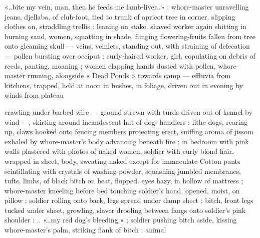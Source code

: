 «..bite my vein, man, then he feeds me lamb-liver..» ; whore-master
unravelling jeans, djellaba, of club-foot, tied to trunk of apricot tree
in corner, slipping clothes on, straddling trellis : leaning on stake.
shaved worker again shitting in burning sand, women, squatting in
shade, flinging flowering-fruits fallen from tree onto gleaming skull
— veins, veinlets, standing out, with straining of defecation —
pollen bursting over occiput ; curly-haired worker, girl, copulating on
debris of reeds, panting, moaning ; women clapping hands dusted
with pollen, whore-master running, alongside « Dead Ponds »
towards camp — effluvia from kitchens, trapped, held at noon in
bushes, in foliage, driven out in evening by winds from plateau

crawling under barbed wire — ground strewn with turds driven out
of kennel by wind —, skirting around incandescent hut of dog-
handlers : lithe dogs, rearing up, claws hooked onto fencing
members projecting erect, sniffing aroma of jissom exhaled by
whore-master's body advancing beneath fire ; in bedroom with pink
walls plastered with photos of naked women, soldier with curly blond
hair, wrapped in sheet, body, sweating naked except for immaculate
Cotton pants scintillating with crystals of washing-powder, squashing
jumbled membranes, tufts, limbs, of black bitch on heat, flopped.
eyes hazy, in hollow of mattress ; whore-master kneeling before bed
touching soldier's hand, opened, moist, on pillow ; soldier rolling
onto back, legs spread under damp sheet ; bitch, front legs tucked
under sheet, growling, slaver drooling between fangs onto soldier's
pink shoulder : .. «..my red dog's bleeding.» ; soldier pushing bitch
aside, kissing whore-master's palm, striking flank of bitch : animal

